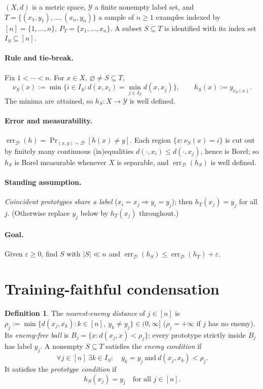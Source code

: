 \documentclass{amsart}
\theoremstyle{definition}
\newtheorem{definition}{Definition}
\DeclareMathOperator{\err}{err}
\begin{document}
$(X,d)$ is a metric space, $\mathcal Y$ a finite nonempty label set, and
$T=\{(x_1,y_1),\dots,(x_n,y_n)\}$ a sample of $n\ge1$ examples indexed by
$[n]=\{1,\dots,n\}$, $P_T=\{x_1,\dots,x_n\}$. A subset $S\subseteq T$ is
identified with its index set $I_S\subseteq[n]$.

\paragraph{Rule and tie-break.} Fix $1<\cdots<n$. For $x\in X$,
$\varnothing\ne S\subseteq T$,
\begin{equation}\label{eq:nn}
\nu_S(x):=\min\Big\{i\in I_S: d(x,x_i)=\min_{j\in I_S}d(x,x_j)\Big\},\qquad
h_S(x):=y_{\nu_S(x)} .
\end{equation}
The minima are attained, so $h_S:X\to\mathcal Y$ is well defined.

\paragraph{Error and measurability.}
$\err_\mathcal D(h)=\Pr_{(x,y)\sim\mathcal D}[h(x)\ne y]$. Each region
$\{x:\nu_S(x)=i\}$ is cut out by finitely many continuous (in)equalities
$d(\cdot,x_i)\le d(\cdot,x_j)$, hence is Borel; so $h_S$ is Borel measurable
whenever $X$ is separable, and $\err_\mathcal D(h_S)$ is well defined.

\paragraph{Standing assumption.} \emph{Coincident prototypes share a label}
($x_i=x_j\Rightarrow y_i=y_j$); then $h_T(x_j)=y_j$ for all $j$. (Otherwise
replace $y_j$ below by $h_T(x_j)$ throughout.)

\paragraph{Goal.} Given $\varepsilon\ge0$, find $S$ with $|S|\ll n$ and
$\err_\mathcal D(h_S)\le\err_\mathcal D(h_T)+\varepsilon$.

\section{Training-faithful condensation}\label{sec:train}

\begin{definition}\label{def:enemy}
The \emph{nearest-enemy distance} of $j\in[n]$ is
$\rho_j:=\min\{d(x_j,x_k):k\in[n],\ y_k\ne y_j\}\in(0,\infty]$
($\rho_j=+\infty$ if $j$ has no enemy). Its \emph{enemy-free ball} is
$B_j=\{x:d(x_j,x)<\rho_j\}$; every prototype strictly inside $B_j$ has label
$y_j$. A nonempty $S\subseteq T$ satisfies the \emph{enemy condition} if
\begin{equation}\label{eq:enemy}
\forall j\in[n]\ \exists k\in I_S:\quad y_k=y_j\ \text{and}\ d(x_j,x_k)<\rho_j .
\end{equation}
It satisfies the \emph{prototype condition} if
\begin{equation}\label{eq:proto}
h_S(x_j)=y_j\quad\text{for all }j\in[n] .
\end{equation}
\end{definition}
\end{document}
